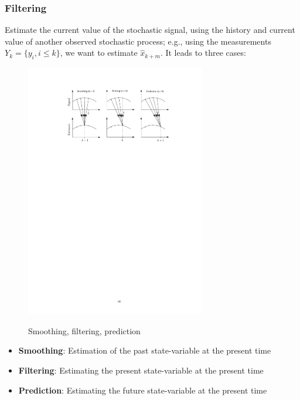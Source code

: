 \begin{frame}
   \frametitle{Filtering}
   
   Estimate the current value of the stochastic signal, using the history and current value of another observed stochastic process; e.g., using the measurements $Y_k = \{y_i, i\leq k\}$, we want to estimate $\hat{x}_{k + m}$. It leads to three cases:
   	\begin{figure}
		\centering
			\includegraphics[width=0.70\textwidth]{Figures/Background/Smoothing, Filtering, and Prediction.pdf}
		\label{fig:WirelessVision}
		\caption{Smoothing, filtering, prediction}
	\end{figure}
	\begin{itemize}
	    \item \textbf{Smoothing}: Estimation of the past state-variable at the present time
	    \item \textbf{Filtering}: Estimating the present state-variable at the present time
	    \item \textbf{Prediction}: Estimating the future state-variable at the present time
	\end{itemize}

\end{frame}


